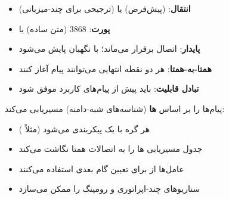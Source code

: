 
\begin{itemize}
\tightlist
\item
  \textbf{انتقال}:  (پیش‌فرض) یا  (ترجیحی برای چند-میزبانی)
\item
  \textbf{پورت}: 3868 (متن ساده) یا 
\item
  \textbf{پایدار}: اتصال برقرار می‌ماند؛ با نگهبان  پایش می‌شود
\item
  \textbf{همتا-به-همتا}: هر دو نقطه انتهایی می‌توانند پیام آغاز کنند
\item
  \textbf{تبادل قابلیت}:  باید پیش از پیام‌های کاربرد موفق شود
\end{itemize}


 پیام‌ها را بر اساس \textbf{ها} (شناسه‌های شبه-دامنه) مسیریابی می‌کند:

\begin{itemize}
\tightlist
\item
  هر گره با یک  پیکربندی می‌شود (مثلاً )
\item
  جدول مسیریابی ها را به اتصالات همتا نگاشت می‌کند
\item
  عامل‌ها از  برای تعیین گام بعدی استفاده می‌کنند
\item
  سناریوهای چند-اپراتوری و رومینگ را ممکن می‌سازد
\end{itemize}




\CNchained{}


